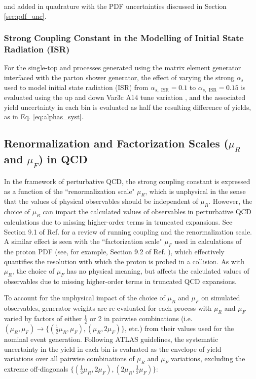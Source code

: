 \noindent and added in quadrature with the PDF uncertainties discussed in Section \ref{sec:pdf_unc}.

\subsubsection{Strong Coupling Constant in the Modelling of Initial State Radiation (ISR)}

For the single-top and \ttbar processes generated using the \POWHEGBOX matrix element generator interfaced with the  parton shower generator, the effect of varying the strong \(\alpha_s\) used to model initial state radiation (ISR) from \(\alpha_{s,\text{ ISR}}=0.1\) to \(\alpha_{s, \text{ ISR}}=0.15\) is evaluated using the up and down Var3c A14 tune variation \cite{ATL-PHYS-PUB-2014-021}, and the associated yield uncertainty in each bin is evaluated as half the resulting difference of yields, as in Eq. \ref{eq:alphas_syst}. 

\subsection{Renormalization and Factorization Scales (\(\mu_R\) and \(\mu_F\)) in QCD}

In the framework of perturbative QCD, the strong coupling constant is expressed as a function of the ``renormalization scale" \(\mu_R\), which is unphysical in the sense that the values of physical observables should be independent of \(\mu_R\). However, the choice of \(\mu_R\) can impact the calculated values of observables in perturbative QCD calculations due to missing higher-order terms in truncated expansions. See Section 9.1 of Ref. \cite{pdg_2020} for a review of running coupling and the renormalization scale. A similar effect is seen with the ``factorization scale" \(\mu_F\) used in calculations of the proton PDF (see, for example, Section 9.2 of Ref. \cite{pdg_2020}), which effectively quantifies the resolution with which the proton is probed in a collision. As with \(\mu_R\), the choice of \(\mu_F\) has no physical meaning, but affects the calculated values of observables due to missing higher-order terms in truncated QCD expansions.

To account for the unphysical impact of the choice of \(\mu_R\) and \(\mu_F\) on simulated observables, generator weights are re-evaluated for each process with \(\mu_R\) and \(\mu_F\) varied by factors of either \(\frac{1}{2}\) or 2 in pairwise combinations (i.e. \((\mu_R, \mu_F)\rightarrow \{(\frac{1}{2}\mu_R, \mu_F), (\mu_R, 2\mu_F)\}\), etc.) from their values used for the nominal event generation. Following ATLAS guidelines, the systematic uncertainty in the yield in each bin is evaluated as the envelope of yield variations over all pairwise combinations of \(\mu_R\) and \(\mu_F\) variations, excluding the extreme off-diagonals \(\{(\frac{1}{2}\mu_R, 2\mu_F), (2\mu_R, \frac{1}{2}\mu_F)\}\): 

